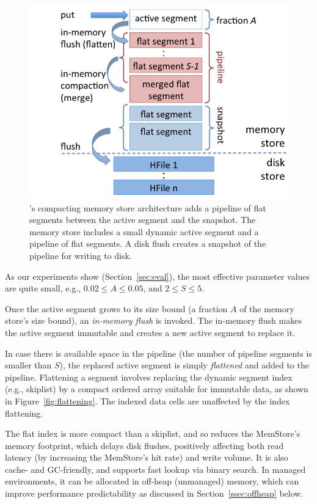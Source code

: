 \begin{figure}[tb]
\center
\includegraphics[width=\columnwidth]{accordion-arch} 
\caption{\sys's compacting memory store architecture adds a pipeline of flat segments between the active segment and the snapshot. 
The memory store includes a small dynamic active segment 
and a pipeline of flat segments. A disk flush creates a snapshot of the pipeline for writing to disk.}
\label{fig:accordion}
\end{figure}

\noindent
As our experiments show (Section~\ref{sec:eval}), the most effective parameter values are quite small, 
e.g., $0.02 \leq A \leq 0.05$, and $2 \leq S \leq 5$.

Once the active segment grows to its size bound (a fraction $A$ of the memory store's size bound), an \emph{in-memory flush} is invoked.
The in-memory flush makes the active segment immutable and creates a new active segment to replace it. 

In case there is available space in the pipeline (the number of pipeline segments is smaller than $S$), the replaced active segment is simply \emph{flattened}  and 
added to the pipeline. Flattening a segment involves replacing the dynamic segment index (e.g., skiplist) by a compact ordered array suitable for immutable data, as shown in Figure~\ref{fig:flattening}.
The indexed data cells are unaffected by the index flattening.

The flat index is more compact than a skiplist, and so reduces the MemStore's memory footprint, which delays  disk flushes, positively affecting both read latency  (by increasing the MemStore's hit rate) and write volume.
It is also cache- and GC-friendly,  and supports fast lookup via binary search. 
In managed environments, it can be allocated in off-heap (unmanaged) memory, which can improve performance predictability as  discussed in Section~\ref{ssec:offheap} below.

